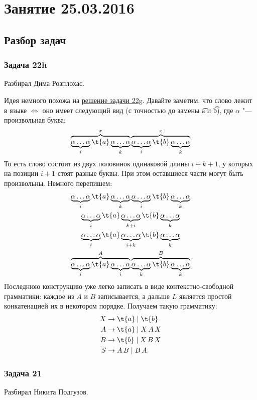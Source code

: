 \chapter{Занятие 25.03.2016}
\section{Разбор задач}

\subsection{Задача 22h}
	Разбирал Дима Розплохас.

	Идея немного похожа на \hyperref[prob22g]{решение задачи 22g}.
	Давайте заметим, что слово лежит в языке $\iff$ оно имеет следующий вид (с точностью до замены \t{a} и \t{b}),
	где $\alpha$ "--- произвольная буква:
	\newcommand{\somealpha}[1]{\underbrace{\alpha\dots\alpha}_{#1}}
	\[
		\overbrace{\somealpha{i}\t{a}\somealpha{k}}^x \overbrace{\somealpha{i}\t{b}\somealpha{k}}^x
	\]
	То есть слово состоит из двух половинок одинаковой длины $i+k+1$, у которых на позиции $i+1$ стоят разные буквы.
	При этом оставшиеся части могут быть произвольны.
	Немного перепишем:
	\begin{gather*}
		\somealpha{i}\t{a}\somealpha{k}\somealpha{i}\t{b}\somealpha{k} \\
		\somealpha{i}\t{a}\somealpha{k+i}\t{b}\somealpha{k} \\
		\somealpha{i}\t{a}\somealpha{i+k}\t{b}\somealpha{k} \\
		\overbrace{\somealpha{i}\t{a}\somealpha{i}}^{A}\overbrace{\somealpha{k}\t{b}\somealpha{k}}^{B}
	\end{gather*}
	Последнюю конструкцию уже легко записать в виде контекстно-свободной грамматики: каждое из $A$ и $B$
	записывается, а дальше $L$ является простой конкатенацией их в некотором порядке.
	Получаем такую грамматику:
	\begin{align*}
		X &\to \t{a} \mid \t{b} \\
		A &\to \t{a} \mid X\,A\,X \\
		B &\to \t{b} \mid X\,B\,X \\
		S &\to A\,B \mid B\,A
	\end{align*}

\subsection{Задача 21}
	Разбирал Никита Подгузов.
	\TODO

